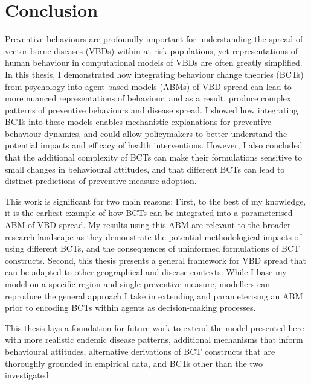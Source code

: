 \section{Conclusion}\label{sec:conclusion}

Preventive behaviours are profoundly important for understanding the spread of vector-borne diseases (VBDs) within at-risk populations, yet representations of human behaviour in computational models of VBDs are often greatly simplified. In this thesis, I demonstrated how integrating behaviour change theories (BCTs) from psychology into agent-based models (ABMs) of VBD spread can lead to more nuanced representations of behaviour, and as a result, produce complex patterns of preventive behaviours and disease spread. I showed how integrating BCTs into these models enables mechanistic explanations for preventive behaviour dynamics, and could allow policymakers to better understand the potential impacts and efficacy of health interventions. However, I also concluded that the additional complexity of BCTs can make their formulations sensitive to small changes in behavioural attitudes, and that different BCTs can lead to distinct predictions of preventive measure adoption.

This work is significant for two main reasons: First, to the best of my knowledge, it is the earliest example of how BCTs can be integrated into a parameterised ABM of VBD spread. My results using this ABM are relevant to the broader research landscape as they demonstrate the potential methodological impacts of using different BCTs, and the consequences of uninformed formulations of BCT constructs. Second, this thesis presents a general framework for VBD spread that can be adapted to other geographical and disease contexts. While I base my model on a specific region and single preventive measure, modellers can reproduce the general approach I take in extending and parameterising an ABM prior to encoding BCTs within agents as decision-making processes.

This thesis lays a foundation for future work to extend the model presented here with more realistic endemic disease patterns, additional mechanisms that inform behavioural attitudes, alternative derivations of BCT constructs that are thoroughly grounded in empirical data, and BCTs other than the two investigated.